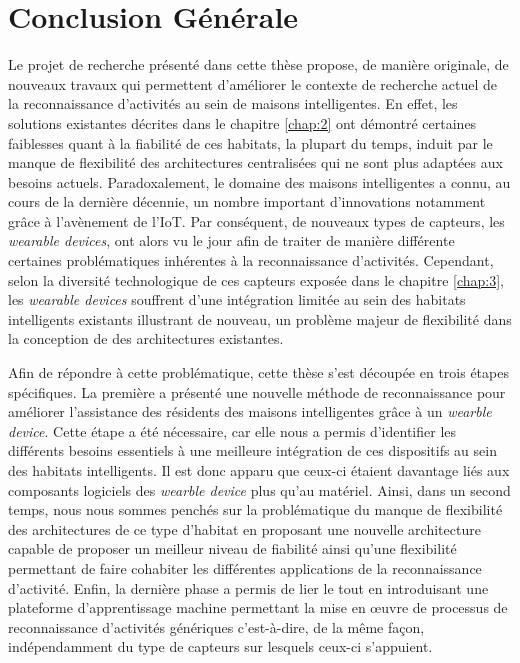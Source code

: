 \chapter{Conclusion Générale}
\label{chap:conclusion}

Le projet de recherche présenté dans cette thèse propose, de manière originale, de nouveaux travaux qui permettent d'améliorer le contexte de recherche actuel de la reconnaissance d'activités au sein de maisons intelligentes. En effet, les solutions existantes décrites dans le chapitre \ref{chap:2} ont démontré certaines faiblesses quant à la fiabilité de ces habitats, la plupart du temps, induit par le manque de flexibilité des architectures centralisées qui ne sont plus adaptées aux besoins actuels. Paradoxalement, le domaine des maisons intelligentes a connu, au cours de la dernière décennie, un nombre important d'innovations notamment grâce à l'avènement de l'\acs{IoT}. Par conséquent, de nouveaux types de capteurs, les \textit{wearable devices}, ont alors vu le jour afin de traiter de manière différente certaines problématiques inhérentes à la reconnaissance d'activités. Cependant, selon la diversité technologique de ces capteurs exposée dans le chapitre \ref{chap:3}, les \textit{wearable devices} souffrent d'une intégration limitée au sein des habitats intelligents existants illustrant de nouveau, un problème majeur de flexibilité dans la conception de des architectures existantes.

Afin de répondre à cette problématique, cette thèse s'est découpée en trois étapes spécifiques. La première a présenté une nouvelle méthode de reconnaissance pour améliorer l'assistance des résidents des maisons intelligentes grâce à un \textit{wearble device}. Cette étape a été nécessaire, car elle nous a permis d'identifier les différents besoins essentiels à une meilleure intégration de ces dispositifs au sein des habitats intelligents. Il est donc apparu que ceux-ci étaient davantage liés aux composants logiciels des \textit{wearble device} plus qu'au matériel. Ainsi, dans un second temps, nous nous sommes penchés sur la problématique du manque de flexibilité des architectures de ce type d'habitat en proposant une nouvelle architecture capable de proposer un meilleur niveau de fiabilité ainsi qu'une flexibilité permettant de faire cohabiter les différentes applications de la reconnaissance d'activité. Enfin, la dernière phase a permis de lier le tout en introduisant une plateforme d'apprentissage machine permettant la mise en \oe{}uvre  de processus de reconnaissance d'activités génériques c'est-à-dire, de la même façon, indépendamment du type de capteurs sur lesquels ceux-ci s'appuient.

